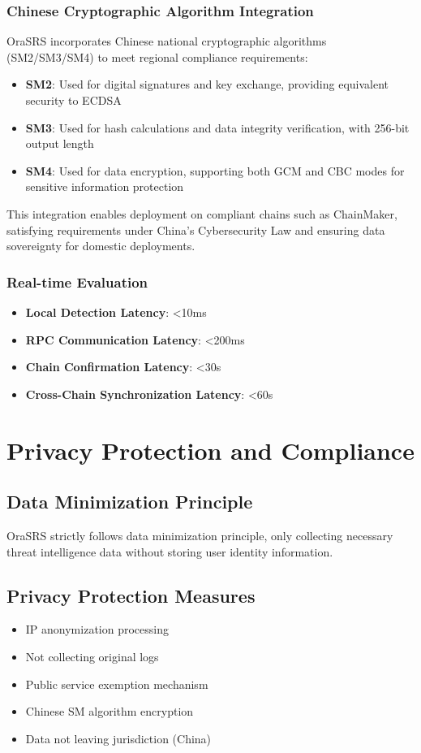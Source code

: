 \documentclass[12pt]{article}
\begin{document}
\subsubsection{Chinese Cryptographic Algorithm Integration}
OraSRS incorporates Chinese national cryptographic algorithms (SM2/SM3/SM4) to meet regional compliance requirements:
\begin{itemize}
\item \textbf{SM2}: Used for digital signatures and key exchange, providing equivalent security to ECDSA
\item \textbf{SM3}: Used for hash calculations and data integrity verification, with 256-bit output length
\item \textbf{SM4}: Used for data encryption, supporting both GCM and CBC modes for sensitive information protection
\end{itemize}

This integration enables deployment on compliant chains such as ChainMaker, satisfying requirements under China's Cybersecurity Law and ensuring data sovereignty for domestic deployments.

\subsubsection{Real-time Evaluation}
\begin{itemize}
\item \textbf{Local Detection Latency}: <10ms
\item \textbf{RPC Communication Latency}: <200ms
\item \textbf{Chain Confirmation Latency}: <30s
\item \textbf{Cross-Chain Synchronization Latency}: <60s
\end{itemize}

\section{Privacy Protection and Compliance}

\subsection{Data Minimization Principle}
OraSRS strictly follows data minimization principle, only collecting necessary threat intelligence data without storing user identity information.

\subsection{Privacy Protection Measures}
\begin{itemize}
\item IP anonymization processing
\item Not collecting original logs
\item Public service exemption mechanism
\item Chinese SM algorithm encryption
\item Data not leaving jurisdiction (China)
\end{itemize}
\end{document}
